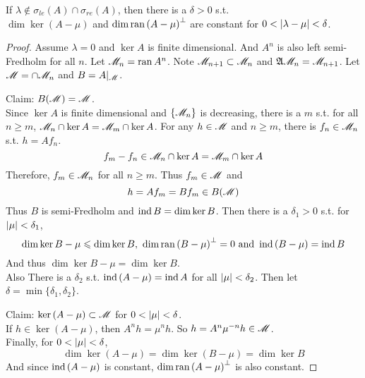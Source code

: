 \documentclass[a4paper,11pt]{report}
\begin{document}
\begin{thm}
	If $\lambda \notin \sigma_{le}(A) \cap \sigma_{re}(A)$, then there is a $\delta > 0$ s.t. \\ $\dim{\ker{(A - \mu)}}$ and $\dim{\operatorname{ran}{(A - \mu)}^{\bot}}$ are constant for $0< \left\lvert\lambda - \mu\right\lvert < \delta$.
\end{thm}
\begin{proof}
	Assume $\lambda = 0$ and $\ker{A}$ is finite dimensional. And $A^n$ is also left semi-Fredholm for all $n$. Let $\mathscr{M}_n = \operatorname{ran}{A^n}$. Note $\mathscr{M}_{n+1} \subset \mathscr{M}_n$ and $\mathfrak{A} \mathscr{M}_{n} = \mathscr{M}_{n+1}$. Let $\mathscr{M} = \cap \mathscr{M}_n$ and $B = A|_{\mathscr{M}}$.
	\item Claim: $B(\mathscr{M}) = \mathscr{M}$.\\
	Since $\ker{A}$ is finite dimensional and $\{\mathscr{M}_n\}$ is decreasing, there is a $m$ s.t. for all $n \geqslant m$, $\mathscr{M}_n \cap \ker{A} = \mathscr{M}_m \cap \ker{A}$. For any $h \in \mathscr{M}$ and $n \geqslant m$, there is $f_n \in \mathscr{M}_n$ s.t. $h = Af_n$. 
	\begin{equation*}
		f_m - f_n \in \mathscr{M}_n \cap \ker{A} = \mathscr{M}_m \cap \ker{A}
	\end{equation*}
	Therefore, $f_m \in \mathscr{M}_n$ for all $n \geqslant m$. Thus $f_m \in \mathscr{M}$ and
	\begin{equation*}
		h = Af_m = Bf_m \in B(\mathscr{M})
	\end{equation*}
	Thus $B$ is semi-Fredholm and $\operatorname{ind}{B} = \dim{\ker{B}}$. Then there is a $\delta_1 > 0$ s.t. for $\left\lvert\mu\right\lvert < \delta_1$,
	\begin{equation*}
		\dim{\ker{B-\mu}} \leqslant \dim{\ker{B}},~ \dim{\operatorname{ran}{(B-\mu)}^{\bot}} = 0 \text{ and } \operatorname{ind}{(B-\mu)} = \operatorname{ind}{B}
	\end{equation*}
	And thus $\dim{\ker{B-\mu}} = \dim{\ker{B}}$. \\
	Also There is a $\delta_2$ s.t. $\operatorname{ind}{(A-\mu)} = \operatorname{ind}{A}$ for all $\left\lvert\mu\right\lvert < \delta_2$. Then let $\delta = \min{\{\delta_1,\delta_2\}}$.
	\item Claim: $\ker{(A-\mu)} \subset \mathscr{M}$ for $0 < \left\lvert\mu\right\lvert < \delta$. \\
	If $h \in \ker{(A-\mu)}$, then $A^n h = \mu^n h$. So $h = A^n \mu^{-n} h \in \mathscr{M}$.\\
	Finally, for $0 < \left\lvert\mu\right\lvert < \delta$,
	\begin{equation*}
		\dim{\ker{(A-\mu)}} = \dim{\ker{(B-\mu)}} = \dim{\ker{B}}
	\end{equation*}
	And since $\operatorname{ind}{(A-\mu)}$ is constant, $\dim{\operatorname{ran}{(A - \mu)}^{\bot}}$ is also constant.
\end{proof}
\end{document}
